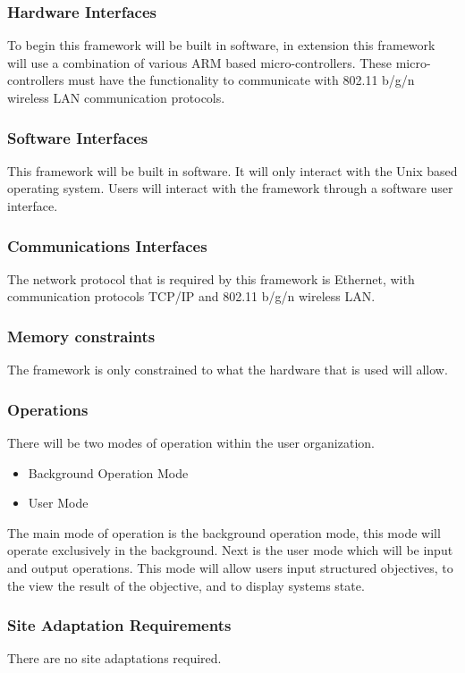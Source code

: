 \documentclass[draftclsnofoot, onecolumn, compsoc, 10pt]{IEEEtran}
\begin{document}
\subsubsection{Hardware Interfaces}
To begin this framework will be built in software, in extension this framework will use a combination of various ARM based micro-controllers. These micro-controllers must have the functionality to communicate with 802.11 b/g/n wireless LAN communication protocols.

\subsubsection{Software Interfaces}
This framework will be built in software. It will only interact with the Unix based operating system. Users will interact with the framework through a software user interface.

\subsubsection{Communications Interfaces}
The network protocol that is required by this framework is Ethernet, with communication protocols TCP/IP and 802.11 b/g/n wireless LAN.

\subsubsection{Memory constraints}
The framework is only constrained to what the hardware that is used will allow.
 
\subsubsection{Operations}
There will be two modes of operation within the user organization. 
\begin{itemize}
\item Background Operation Mode \\
\item User Mode \\ 
\end{itemize}
The main mode of operation is the background operation mode, this mode will operate exclusively in the background. Next is the user mode which will be input and output operations. This mode will allow users input structured objectives, to the view the result of the objective, and to display systems state.

\subsubsection{Site Adaptation Requirements}
There are no site adaptations required.
\end{document}
